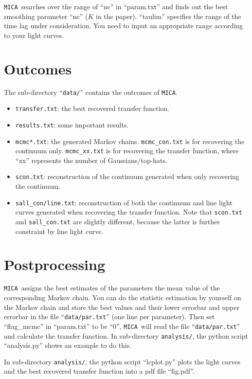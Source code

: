 \documentclass[preprint]{aastex}
\def\mica{{\texttt{MICA}}}
\begin{document}
\mica~searches over the range of ``nc'' in ``param.txt'' and finds out the best smoothing parameter
``nc'' ($K$ in the paper). ``taulim'' specifies the range of the time lag under consideration. You 
need to input an appropriate range according to your light curves.

\section{Outcomes}
The sub-directory ``\texttt{data/}'' contains the outcomes of \mica.
\begin{itemize}
 \item \texttt{transfer.txt}: the best recovered transfer function.
 \item \texttt{results.txt}: some important results.
 \item \texttt{mcmc*.txt}: the generated Markov chains. \texttt{mcmc\_con.txt} is for recovering the continuum 
 only. \texttt{mcmc\_xx.txt} is for recovering the transfer function, where ``xx''
 represents the number of Gaussians/top-hats.
 \item \texttt{scon.txt}: reconstruction of the continuum generated when only recovering the continuum.
 \item \texttt{sall\_con/line.txt}: reconstruction of both the continuum and line light curves
 generated when recovering the transfer function. Note that \texttt{scon.txt} and \texttt{sall\_con.txt}
 are slightly different, because the latter is further constraint by line light curve.
\end{itemize}

\section{Postprocessing}
\mica~assigns the best estimates of the parameters the mean value of the corresponding Markov chain. 
You can do the statistic estimation by yourself on the Markov chain and store the best values and their 
lower errorbar and upper errorbar in the file ``\texttt{data/par.txt}'' (one line per parameter).
Then set ``flag\_mcmc'' in ``param.txt'' to be ``0'', \mica~will read the file ``\texttt{data/par.txt}''
and calculate the transfer function. In sub-directory \texttt{analysis/}, the python script ``analysis.py''
shows an example to do this.

In sub-directory \texttt{analysis/}, the python script ``lcplot.py'' plots the light curves and the best 
recovered transfer function into a pdf file ``fig.pdf''.
\end{document}
